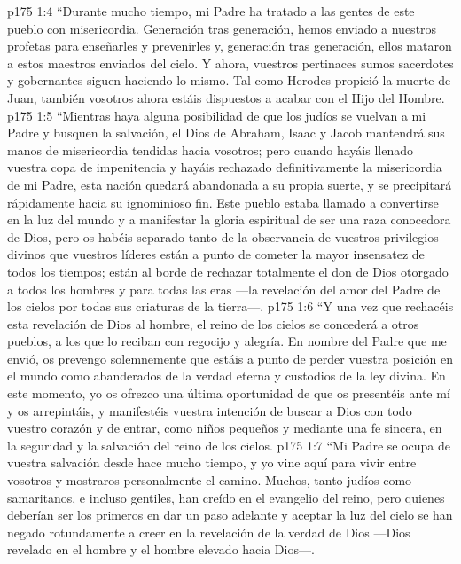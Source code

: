 \vs p175 1:4 “Durante mucho tiempo, mi Padre ha tratado a las gentes de este pueblo con misericordia. Generación tras generación, hemos enviado a nuestros profetas para enseñarles y prevenirles y, generación tras generación, ellos mataron a estos maestros enviados del cielo. Y ahora, vuestros pertinaces sumos sacerdotes y gobernantes siguen haciendo lo mismo. Tal como Herodes propició la muerte de Juan, también vosotros ahora estáis dispuestos a acabar con el Hijo del Hombre.
\vs p175 1:5 “Mientras haya alguna posibilidad de que los judíos se vuelvan a mi Padre y busquen la salvación, el Dios de Abraham, Isaac y Jacob mantendrá sus manos de misericordia tendidas hacia vosotros; pero cuando hayáis llenado vuestra copa de impenitencia y hayáis rechazado definitivamente la misericordia de mi Padre, esta nación quedará abandonada a su propia suerte, y se precipitará rápidamente hacia su ignominioso fin. Este pueblo estaba llamado a convertirse en la luz del mundo y a manifestar la gloria espiritual de ser una raza conocedora de Dios, pero os habéis separado tanto de la observancia de vuestros privilegios divinos que vuestros líderes están a punto de cometer la mayor insensatez de todos los tiempos; están al borde de rechazar totalmente el don de Dios otorgado a todos los hombres y para todas las eras ---la revelación del amor del Padre de los cielos por todas sus criaturas de la tierra---.
\vs p175 1:6 “Y una vez que rechacéis esta revelación de Dios al hombre, el reino de los cielos se concederá a otros pueblos, a los que lo reciban con regocijo y alegría. En nombre del Padre que me envió, os prevengo solemnemente que estáis a punto de perder vuestra posición en el mundo como abanderados de la verdad eterna y custodios de la ley divina. En este momento, yo os ofrezco una última oportunidad de que os presentéis ante mí y os arrepintáis, y manifestéis vuestra intención de buscar a Dios con todo vuestro corazón y de entrar, como niños pequeños y mediante una fe sincera, en la seguridad y la salvación del reino de los cielos.
\vs p175 1:7 “Mi Padre se ocupa de vuestra salvación desde hace mucho tiempo, y yo vine aquí para vivir entre vosotros y mostraros personalmente el camino. Muchos, tanto judíos como samaritanos, e incluso gentiles, han creído en el evangelio del reino, pero quienes deberían ser los primeros en dar un paso adelante y aceptar la luz del cielo se han negado rotundamente a creer en la revelación de la verdad de Dios ---Dios revelado en el hombre y el hombre elevado hacia Dios---.
